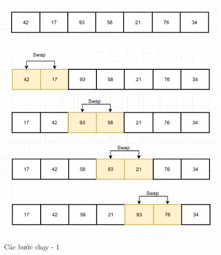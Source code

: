 \begin{figure}[H]
    \centering
    \includegraphics[width=1\linewidth]{img/bubble_sort/1.png}
    
    \vspace{0.5cm}
    \includegraphics[width=1\linewidth]{img/bubble_sort/2.png}
    \vspace{0.5cm}
    \includegraphics[width=1\linewidth]{img/bubble_sort/3.png}
    \vspace{0.5cm}
    \includegraphics[width=1\linewidth]{img/bubble_sort/4.png}
    \vspace{0.5cm}
    \includegraphics[width=1\linewidth]{img/bubble_sort/5.png}
    \caption{Các bước chạy - 1}
    \label{fig:part1}
\end{figure}

